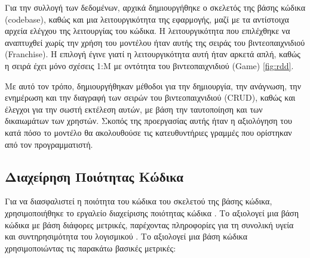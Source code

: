 Για την συλλογή των δεδομένων, αρχικά δημιουργήθηκε ο σκελετός της βάσης
κώδικα \textlatin{(codebase)}, καθώς και μια λειτουργικότητα της
εφαρμογής, μαζί με τα αντίστοιχα αρχεία ελέγχου της λειτουργίας του
κώδικα. Η λειτουργικότητα που επιλέχθηκε να αναπτυχθεί χωρίς την χρήση
του μοντέλου ήταν αυτής της σειράς του βιντεοπαιχνιδιού
\textlatin{(Franchise)}. Η επιλογή έγινε γιατί η λειτουργικότητα αυτή
ήταν αρκετά απλή, καθώς η σειρά έχει μόνο σχέσεις 1:Μ με οντότητα του
βιντεοπαιχνιδιού \textlatin{(Game)} \ref{fig:rdd}.

Με αυτό τον τρόπο, δημιουργήθηκαν μέθοδοι για την δημιουργία, την
ανάγνωση, την ενημέρωση και την διαγραφή των σειρών του βιντεοπαιχνιδιού
\textlatin{(CRUD)}, καθώς και έλεγχοι για την σωστή εκτέλεση αυτών, με
βάση την ταυτοποίηση και των δικαιωμάτων των χρηστών. Σκοπός της
προεργασίας αυτής ήταν η αξιολόγηση του κατά πόσο το μοντέλο θα
ακολουθούσε τις κατευθυντήριες γραμμές που ορίστηκαν από τον
προγραμματιστή.

\subsection{Διαχείρηση Ποιότητας Κώδικα}
Για να διασφαλιστεί η ποιότητα του κώδικα του σκελετού της βάσης
κώδικα, χρησιμοποιήθηκε το εργαλείο διαχείρισης ποιότητας κώδικα
. Το  αξιολογεί μια βάση κώδικα
με βάση διάφορες μετρικές, παρέχοντας πληροφορίες για τη συνολική
υγεία και συντηρησιμότητα του λογισμικού \cite{cyclopt}.
Το  αξιολογεί μια βάση κώδικα χρησιμοποιώντας τις παρακάτω
βασικές μετρικές:

